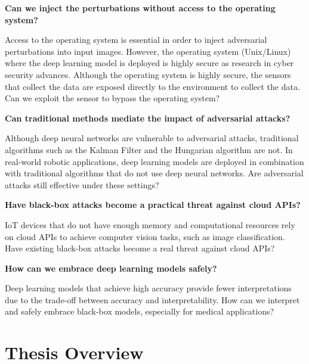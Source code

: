 \vspace{0.5cm}

\textbf{Can we inject the perturbations without access to the operating system?}

Access to the operating system is essential in order to inject adversarial perturbations into input images. However, the operating system (Unix/Linux) where the deep learning model is deployed is highly secure as research in cyber security advances. Although the operating system is highly secure, the sensors that collect the data are exposed directly to the environment to collect the data. Can we exploit the sensor to bypass the operating system?

\vspace{0.5cm}

\textbf{Can traditional methods mediate the impact of adversarial attacks?}

Although deep neural networks are vulnerable to adversarial attacks, traditional algorithms such as the Kalman Filter and the Hungarian algorithm are not. In real-world robotic applications, deep learning models are deployed in combination with traditional algorithms that do not use deep neural networks. Are adversarial attacks still effective under these settings?

\vspace{0.5cm}

\textbf{Have black-box attacks become a practical threat against cloud APIs?}

IoT devices that do not have enough memory and computational resources rely on cloud APIs to achieve computer vision tasks, such as image classification. Have existing black-box attacks become a real threat against cloud APIs?

\vspace{0.5cm}

\textbf{How can we embrace deep learning models safely?}

Deep learning models that achieve high accuracy provide fewer interpretations due to the trade-off between accuracy and interpretability. How can we interpret and safely embrace black-box models, especially for medical applications?



\section{Thesis Overview}


